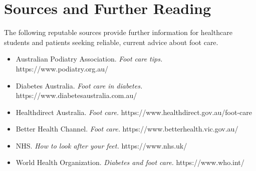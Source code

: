 \section*{Sources and Further Reading}
The following reputable sources provide further information for healthcare students and patients seeking reliable, current advice about foot care.
\begin{itemize}
    \item Australian Podiatry Association. \textit{Foot care tips.} https://www.podiatry.org.au/
    \item Diabetes Australia. \textit{Foot care in diabetes.} https://www.diabetesaustralia.com.au/
    \item Healthdirect Australia. \textit{Foot care.} https://www.healthdirect.gov.au/foot-care
    \item Better Health Channel. \textit{Foot care.} https://www.betterhealth.vic.gov.au/
    \item NHS. \textit{How to look after your feet.} https://www.nhs.uk/
    \item World Health Organization. \textit{Diabetes and foot care.} https://www.who.int/
\end{itemize}
